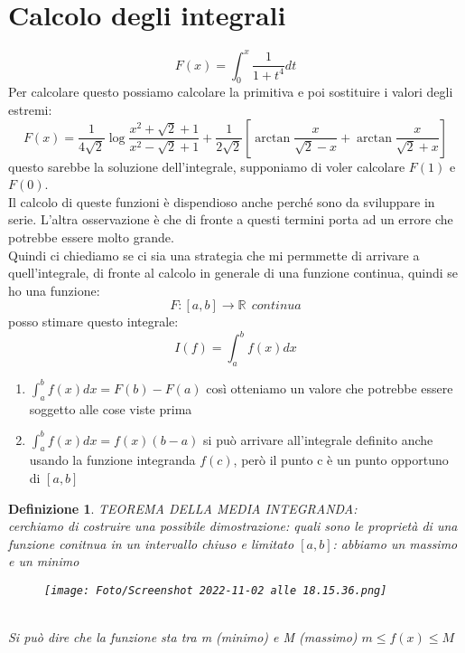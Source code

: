 \documentclass[a4paper, portrait]{book}
\numberwithin{equation}{chapter} %
\newtheorem{definition}{Definizione}
\begin{document}
\section{Calcolo degli integrali}
\begin{equation}
    F(x) = \int_0^x \frac{1}{1+t^4} dt
\end{equation}
Per calcolare questo possiamo calcolare la primitiva e poi sostituire i valori degli estremi:
\begin{equation}
    F(x) = \frac{1}{4\sqrt{2}}\log{\frac{x^2+\sqrt{2}+1}{x^2- \sqrt{2}+1}}+\frac{1}{2\sqrt{2}}\left[\arctan\frac{x}{\sqrt{2}-x}+\arctan\frac{x}{\sqrt{2}+x}\right]
\end{equation}
questo sarebbe la soluzione dell'integrale, supponiamo di voler calcolare $F(1)$ e $F(0)$.\\
Il calcolo di queste funzioni è dispendioso anche perché sono da sviluppare in serie. L'altra osservazione è che di fronte a questi termini porta ad un errore che potrebbe essere molto grande.\\
Quindi ci chiediamo se ci sia una strategia che mi permmette di arrivare a quell'integrale, di fronte al calcolo in generale di una funzione continua, quindi se ho una funzione:
\begin{equation}
    F: [a,b] \rightarrow \mathbb{R} \ \ continua
\end{equation}
posso stimare questo integrale:
\begin{equation}
    I(f) = \int_a^b f(x) dx
\end{equation}
\begin{enumerate}
    \item $\int_a^b f(x) dx = F(b) - F(a)$ così otteniamo un valore che potrebbe essere soggetto alle cose viste prima
    \item $\int_a^b f(x) dx = f(x)(b-a)$ si può arrivare all'integrale definito anche usando la funzione integranda $f(c)$, però il punto c è un punto opportuno di $[a,b]$
\end{enumerate}
\newpage
\begin{definition}
    TEOREMA DELLA MEDIA INTEGRANDA:\\
    cerchiamo di costruire una possibile dimostrazione: quali sono le proprietà di una funzione conitnua in un intervallo chiuso e limitato $[a,b]$: abbiamo un massimo e un minimo
    \begin{figure}[h!]
        \centering
        \texttt{[image: Foto/Screenshot 2022-11-02 alle 18.15.36.png]}
        \caption{}
    \end{figure}
    \\Si può dire che la funzione sta tra m (minimo) e M (massimo) $m\leq f(x) \leq M$
\end{definition}
\end{document}
